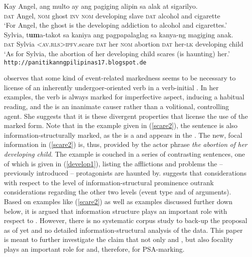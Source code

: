 \documentclass[output=paper,
,modfonts
,nonflat]{langsci/langscibook}
\begin{document}
\begin{exe}
\ex\label{scareEx2}
\begin{xlist}
\ex\label{develop1}
\gll Kay Angel, ang multo ay ang pagiging      alipin sa alak at sigarilyo.\\
 \textsc{dat} Angel, \textsc{nom} ghost   \textsc{inv} \textsc{nom} developing slave   \textsc{dat} alcohol and cigarette\\
\glt `For Angel, the ghost is the developing addiction to alcohol and cigarettes.'
\ex\label{scare2}
 {Sylvia,{\cb}\ug} t{\USSmaller}\textbf{um}{\USGreater}a-takot {{\ob}sa} {kaniya{\cb}\ug} {{\ob}ang} pagpapalaglag sa kanya-ng magiging {anak{\cb}\act}.\\
  	\textsc{\void{[}dat} Sylvia \textsc{<av.rls>ipfv}.scare \textsc{\void{[}dat} her \textsc{\void{[}nom} abortion \textsc{dat} her-\textsc{lk} developing child\\
\glt `As for Sylvia, the abortion of her developing child scares (is haunting) her.'\\
\hfill \texttt{http://panitikanngpilipinas17.blogspot.de}
\end{xlist}
\end{exe}

\noindent \cite{latan11} observes that some kind of event-related markedness seems to be necessary to license  of an inherently undergoer-oriented verb in a verb-initial . In her examples, the verb is always marked for imperfective aspect, inducing a habitual reading, and the  is an inanimate causer rather than a volitional, controlling agent. She suggests that it is these divergent properties that license the use of the marked  form. Note that in the example given in (\ref{scare2}), the sentence is also in\-for\-ma\-tion-struc\-tu\-ral\-ly marked, as the  is a  and appears in the . The new, focal  information in (\ref{scare2}) is, thus, provided by the actor phrase \textit{the abortion of her developing child}. The example is couched in a series of contrasting sentences, one of which is given in (\ref{develop1}), listing the afflictions and problems the -- previously introduced -- protagonists are haunted by. \cite{latan11} suggests that considerations with respect to the level of in\-for\-ma\-tion-struc\-tu\-ral pro\-mi\-nence outrank considerations regarding the other two levels (event type and  of arguments). Based on examples like (\ref{scare2}) as well as examples discussed further down below, it is argued that information structure plays an important role with respect to . However, there is no systematic corpus study to back-up the proposal as of yet and no detailed in\-for\-ma\-tion-struc\-tur\-al analysis of the data. This paper is meant to further investigate the claim that not only  and , but also focality plays an important role for  and, therefore, for PSA-marking. 
\end{document}

